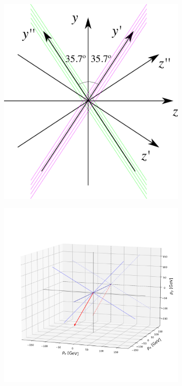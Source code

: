 \begin{figure}[t]
	\begin{subfigure}{0.5\textwidth}
		\centering
		\includegraphics[width=.8\linewidth]{Images/Matched_Filter/sim_rotation}
	\end{subfigure}
	\begin{subfigure}{0.5\textwidth}
		\centering
		\includegraphics[width=.99\linewidth]{Images/Matched_Filter/3D_rotation}

\end{subfigure}
\end{figure}

